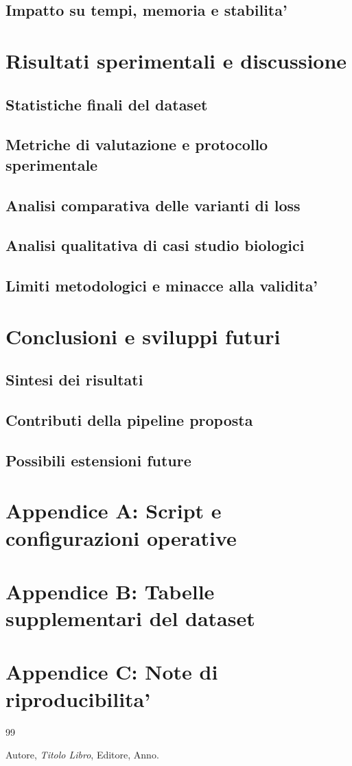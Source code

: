 \documentclass[12pt,a4paper,oneside]{report} %
\begin{document}
\section{Impatto su tempi, memoria e stabilita'}

\chapter{Risultati sperimentali e discussione}
\section{Statistiche finali del dataset}
\section{Metriche di valutazione e protocollo sperimentale}
\section{Analisi comparativa delle varianti di loss}
\section{Analisi qualitativa di casi studio biologici}
\section{Limiti metodologici e minacce alla validita'}

\chapter{Conclusioni e sviluppi futuri}
\section{Sintesi dei risultati}
\section{Contributi della pipeline proposta}
\section{Possibili estensioni future}

\appendix
\chapter{Appendice A: Script e configurazioni operative}
\chapter{Appendice B: Tabelle supplementari del dataset}
\chapter{Appendice C: Note di riproducibilita'}

\begin{thebibliography}{99}
 Autore, \textit{Titolo Libro}, Editore, Anno.
\end{thebibliography}
\end{document}
